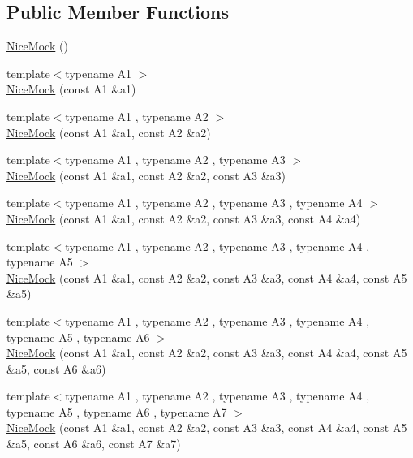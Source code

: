 \subsection*{Public Member Functions}
\begin{DoxyCompactItemize}
\item 
\hyperlink{classtesting_1_1_nice_mock_a10bbd6ebe779ac8ab1f9f3ae2dee9310}{Nice\+Mock} ()
\item 
{\footnotesize template$<$typename A1 $>$ }\\\hyperlink{classtesting_1_1_nice_mock_a2d6b9cb9d929d1af4532b69c7ef19df6}{Nice\+Mock} (const A1 \&a1)
\item 
{\footnotesize template$<$typename A1 , typename A2 $>$ }\\\hyperlink{classtesting_1_1_nice_mock_a150837476e88f52772c8f85180b889a1}{Nice\+Mock} (const A1 \&a1, const A2 \&a2)
\item 
{\footnotesize template$<$typename A1 , typename A2 , typename A3 $>$ }\\\hyperlink{classtesting_1_1_nice_mock_a0b91bd74b497626bb81d07c3d4b59d22}{Nice\+Mock} (const A1 \&a1, const A2 \&a2, const A3 \&a3)
\item 
{\footnotesize template$<$typename A1 , typename A2 , typename A3 , typename A4 $>$ }\\\hyperlink{classtesting_1_1_nice_mock_a5ffbe1a648f16612266d4e67a2d063d1}{Nice\+Mock} (const A1 \&a1, const A2 \&a2, const A3 \&a3, const A4 \&a4)
\item 
{\footnotesize template$<$typename A1 , typename A2 , typename A3 , typename A4 , typename A5 $>$ }\\\hyperlink{classtesting_1_1_nice_mock_a3812c0ba0d743f9a0c3d276dfc076f4c}{Nice\+Mock} (const A1 \&a1, const A2 \&a2, const A3 \&a3, const A4 \&a4, const A5 \&a5)
\item 
{\footnotesize template$<$typename A1 , typename A2 , typename A3 , typename A4 , typename A5 , typename A6 $>$ }\\\hyperlink{classtesting_1_1_nice_mock_a156d0fce85ac08abffdf4aa0c3975f81}{Nice\+Mock} (const A1 \&a1, const A2 \&a2, const A3 \&a3, const A4 \&a4, const A5 \&a5, const A6 \&a6)
\item 
{\footnotesize template$<$typename A1 , typename A2 , typename A3 , typename A4 , typename A5 , typename A6 , typename A7 $>$ }\\\hyperlink{classtesting_1_1_nice_mock_a946d75ece1fa3a066b7d9d6ab7828c55}{Nice\+Mock} (const A1 \&a1, const A2 \&a2, const A3 \&a3, const A4 \&a4, const A5 \&a5, const A6 \&a6, const A7 \&a7)

\end{DoxyCompactItemize}
